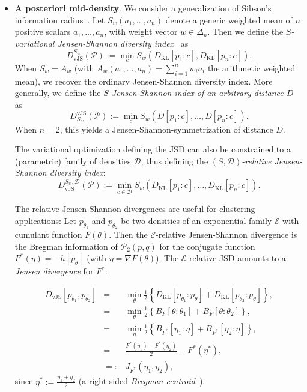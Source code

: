\documentclass[11pt]{article}
\def\calE{\mathcal{E}}
\def\KL{\mathrm{KL}}
\def\calE{\mathcal{E}}
\def\calD{\mathcal{D}}
\def\calP{\mathcal{P}}
\def\KL{\mathrm{KL}}
\def\vJS{\mathrm{vJS}}
\begin{document}
\begin{itemize}
	\item {\bf A posteriori mid-density}.
	We consider a generalization of Sibson's information radius~\cite{Sibson-1969}.
	Let $S_w(a_1,\ldots,a_n)$ denote a generic weighted mean of $n$ positive scalars $a_1,\ldots, a_n$, with weight vector $w\in\Delta_n$.
	Then we define the {\em $S$-variational Jensen-Shannon diversity index}~\cite{vJSD-2021} as
	\begin{equation}
	D_\vJS^{S_w}(\calP) := \min_{c} S_w\left(D_\KL[p_1:c],D_\KL[p_n:c]\right).
	\end{equation}
	When $S_w=A_w$ (with $A_w(a_1,\ldots,a_n)=\sum_{i=1}^n w_i a_i$ the arithmetic weighted mean), we recover the ordinary Jensen-Shannon diversity index.
			More generally, we define the {\em $S$-Jensen-Shannon index of an arbitrary distance $D$} as
	\begin{equation}
D^\vJS_{S_w}(\calP):=\min_{c} S_w\left(D[p_1:c],\ldots, D[p_n:c]\right).	
\end{equation}
When $n=2$, this yields a Jensen-Shannon-symmetrization of distance $D$.

The variational optimization defining the JSD can also be constrained to a (parametric) family of densities $\calD$, thus defining 
	the {\em $(S,\calD)$-relative Jensen-Shannon diversity index}:
	\begin{equation}
	D_\vJS^{S_w,\calD}(\calP) := \min_{c\in\calD} S_w\left(D_\KL[p_1:c],\ldots, D_\KL[p_n:c]\right).
	\end{equation}
	

The relative Jensen-Shannon divergences are useful for clustering applications:
Let $p_{\theta_1}$ and $p_{\theta_2}$ be two densities of an exponential family $\mathcal{E}$ with cumulant function $F(\theta)$.
Then the $\mathcal{E}$-relative Jensen-Shannon divergence is the Bregman information of $\calP_2(p,q)$ for the conjugate function $F^*(\eta)=-h[p_\theta]$ 
(with $\eta=\nabla F(\theta)$). The $\calE$-relative JSD amounts to  a {\em Jensen divergence} for $F^*$:

\begin{eqnarray}
D_\vJS[p_{\theta_1},p_{\theta_2}] &=& \min_\theta \frac{1}{2}\left\{D_\KL[p_{\theta_1}:p_{\theta}]+D_\KL[p_{\theta_2}:p_{\theta}]\right\},\\
 &=& \min_\theta \frac{1}{2}\left\{B_F[\theta:\theta_1]+B_F[\theta:\theta_2]\right\},\\
 &=&  \min_\eta  \frac{1}{2}\left\{B_{F^*}[\eta_1:\eta]+B_{F^*}[\eta_2:\eta]\right\},\\
&=& \frac{F^*(\eta_1)+F^*(\eta_2)}{2}-F^*(\eta^*),\\
&=:& J_{F^*}(\eta_1,\eta_2),
\end{eqnarray}
since $\eta^*:=\frac{\eta_1+\eta_2}{2}$ (a right-sided {\em Bregman centroid}~\cite{SBD-2009}).
 

	



\end{itemize}
\end{document}
